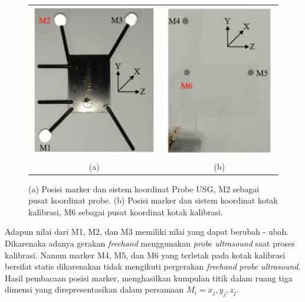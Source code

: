 \begin{figure}[htbp]
	\centering
	\begin{tabular}{ll}
		\includegraphics[scale=0.9]{bab2/marker_m2}
		&
		\includegraphics[scale=0.9]{bab2/marker_m6} \\
		\multicolumn{1}{c}{(a)} & \multicolumn{1}{c}{(b)}
	\end{tabular}
	\caption{(a) Posisi marker dan sistem koordinat Probe USG, M2 sebagai pusat koordinat probe. (b) Posisi marker dan sistem koordinat kotak kalibrasi, M6 sebagai pusat koordinat kotak kalibrasi.}
	\label{fig:posisi_kalibrasi}
\end{figure}




Adapun nilai dari M1, M2, dan M3 memiliki nilai yang dapat berubah - ubah. Dikarenaka adanya gerakan \textit{freehand} menggunakan \textit{probe ultrasound} saat proses kalibrasi. Namun marker M4, M5, dan M6 yang terletak pada kotak kalibrasi bersifat statis dikarenakan tidak mengikuti pergerakan \textit{freehand} \textit{probe} \textit{ultrasound}. Hasil pembacaan posisi marker, menghasilkan kumpulan titik dalam ruang tiga dimensi yang direpresentasikan dalam persamaan $M_i = x_j, y_j, z_j$. 


